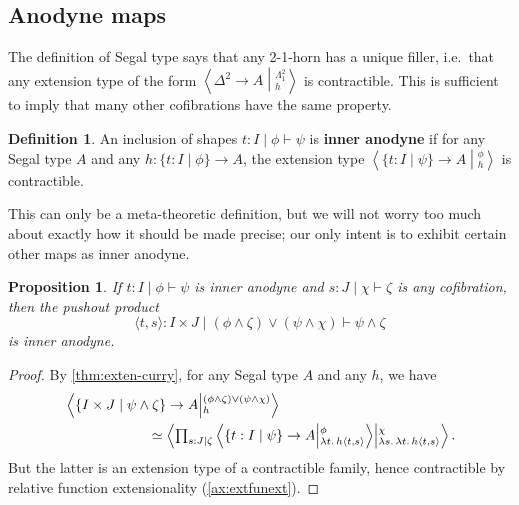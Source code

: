 \documentclass[12pt]{amsart}
\theoremstyle{plain}
\newtheorem{prop}[thm]{Proposition}
\theoremstyle{definition}
\newtheorem{defn}[thm]{Definition}
\theoremstyle{remark}
\numberwithin{equation}{section}
\newcommand{\exten}[4]{\left\langle\mathchoice{\textstyle\prod_{#1}}{\textstyle\prod_{#1}}{\scriptstyle\prod_{#1}}{\scriptscriptstyle\prod_{#1}} #2 \middle|^{#3}_{#4}\right\rangle}
\newcommand{\ndexten}[4]{\left\langle #1 \to #2 \middle|^{#3}_{#4}\right\rangle}
\newcommand{\types}{\vdash}
\newcommand{\sh}[2]{\{#1\mid #2\}}
\newcommand{\pair}[1]{\langle #1\rangle}
\newcommand{\lam}[1]{\lambda #1.\,}
\begin{document}
\subsection{Anodyne maps}
\label{sec:anodyne}

The definition of Segal type says that any 2-1-horn has a unique filler, i.e.\ that any extension type of the form $\ndexten{\Delta^2}{A}{\Lambda^2_1}{h}$ is contractible.
This is sufficient to imply that many other cofibrations have the same property.

\begin{defn}
  An inclusion of shapes $t:I \mid \phi\types\psi$ is \textbf{inner anodyne} if for any Segal type $A$ and any $h:\sh{t:I}{\phi}\to A$, the extension type $\ndexten{\sh{t:I}{\psi}}{A}{\phi}{h}$ is contractible.
\end{defn}

This can only be a meta-theoretic definition, but we will not worry too much about exactly how it should be made precise; our only intent is to exhibit certain other maps as inner anodyne.

\begin{prop}\label{thm:pop-anodyne}
  If $t:I \mid \phi\types\psi$ is inner anodyne and $s:J \mid \chi \types \zeta$ is any cofibration, then the pushout product
  \[ {\pair{t,s}:I\times J} \mid {(\phi\land\zeta)\lor(\psi\land\chi)} \types \psi\land \zeta \]
  is inner anodyne.
\end{prop}
\begin{proof}
  By \cref{thm:exten-curry}, for any Segal type $A$ and any $h$, we have
  \begin{align*}
&    \ndexten{\sh{I\times J}{\psi\land\zeta}}{A}{(\phi\land\zeta)\lor(\psi\land\chi)}{h}\\
    &\qquad\qquad\qquad\simeq \exten{s:J|\zeta}{\ndexten{\sh{t:I}{\psi}}{A}{\phi}{\lam{t}h{\pair{t,s}}}}{\chi}{\lam{s}\lam{t}h{\pair{t,s}}}.
  \end{align*}
  But the latter is an extension type of a contractible family, hence contractible by relative function extensionality (\cref{ax:extfunext}).
\end{proof}
\end{document}

